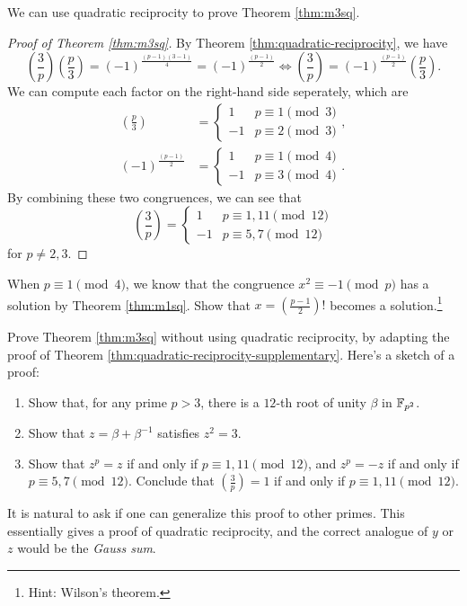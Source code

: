 We can use quadratic reciprocity to prove Theorem \ref{thm:m3sq}.
\begin{proof}[Proof of Theorem \ref{thm:m3sq}]
    By Theorem \ref{thm:quadratic-reciprocity}, we have
    \[
    \left(\frac{3}{p}\right) \left(\frac{p}{3}\right) = (-1)^{\frac{(p-1)(3-1)}{4}} = (-1)^{\frac{(p-1)}{2}} \Leftrightarrow \left(\frac{3}{p}\right) = (-1)^{\frac{(p-1)}{2}} \left(\frac{p}{3}\right).
    \]
    We can compute each factor on the right-hand side seperately, which are
    \begin{align*}
        \left(\frac{p}{3}\right) &= \begin{cases} 1 & p \equiv 1 \pmod{3} \\ -1 & p \equiv 2 \pmod{3} \end{cases}, \\
        (-1)^{\frac{(p-1)}{2}} &= \begin{cases} 1 & p \equiv 1 \pmod{4} \\ -1 & p \equiv 3 \pmod{4} \end{cases}.
    \end{align*}
    By combining these two congruences, we can see that
    \[
    \left(\frac{3}{p}\right) = \begin{cases}
        1 & p \equiv 1, 11 \pmod{12} \\
        -1 & p \equiv 5, 7 \pmod{12}
    \end{cases}
    \]
    for $p \neq 2, 3$.
\end{proof}

\begin{exercise}
    When $p \equiv 1 \pmod{4}$, we know that the congruence $x^2 \equiv -1 \pmod{p}$ has a solution by Theorem \ref{thm:m1sq}.
    Show that $x = \left(\frac{p-1}{2}\right)!$ becomes a solution.\footnote{Hint: Wilson's theorem.}
\end{exercise}

\begin{exercise}
    Prove Theorem \ref{thm:m3sq} without using quadratic reciprocity, by adapting the proof of Theorem \ref{thm:quadratic-reciprocity-supplementary}.
    Here's a sketch of a proof:
    \begin{enumerate}
        \item Show that, for any prime $p > 3$, there is a $12$-th root of unity $\beta$ in $\mathbb{F}_{p^2}$.
        \item Show that $z = \beta + \beta^{-1}$ satisfies $z^2 = 3$.
        \item Show that $z^p = z$ if and only if $p \equiv 1, 11 \pmod{12}$, and $z^p = -z$ if and only if $p \equiv 5, 7 \pmod{12}$. Conclude that $\left(\frac{3}{p}\right) = 1$ if and only if $p \equiv 1, 11 \pmod{12}$.
    \end{enumerate}
    It is natural to ask if one can generalize this proof to other primes.
    This essentially gives a proof of quadratic reciprocity, and the correct analogue of $y$ or $z$ would be the \emph{Gauss sum}.
\end{exercise}

